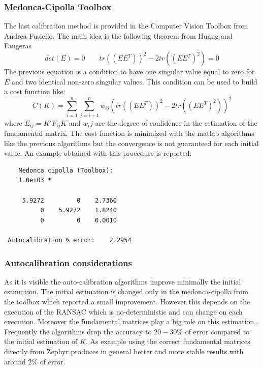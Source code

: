 \documentclass[12pt]{article}
\begin{document}
\subsubsection{Medonca-Cipolla Toolbox}
The last calibration method is provided in the Computer Vision Toolbox from Andrea Fusiello. The main idea is the following theorem from Huang and Faugeras \cite{Faugeras89}
\begin{equation}
    det(E) = 0 \qquad tr((EE^T))^2 - 2 tr((EE^T)^2) = 0
\end{equation}
The previous equation is a condition to have one singular value equal to zero for $E$ and two identical non-zero singular values. This condition can be used to build a cost function like:
\begin{equation}
    C(K) = \sum_{i=1}^{n} \sum_{j=i+1}^{n} w_{ij} (tr((EE^T))^2 - 2 tr((EE^T)^2))^2
\end{equation}
where $E_{ij} = K'F_{ij}K$ and $w_ij$ are the degree of confidence in the estimation of the fundamental matrix. The cost function is minimized with the matlab algorithms like the previous algorithms but the convergence is not guaranteed for each initial value. An example obtained with this procedure is reported:
\begin{verbatim}
    Medonca cipolla (Toolbox): 
    1.0e+03 *
 
     5.9272         0    2.7360
          0    5.9272    1.8240
          0         0    0.0010
 
 Autocalibration % error:	 2.2954  
\end{verbatim}
\newpage

\subsubsection{Autocalibration considerations}
As it is visible the auto-calibration algorithms improve minimally the initial estimation. The initial estimation is changed only in the medonca-cipolla from the toolbox which reported a small improvement. However this depends on the execution of the RANSAC which is no-deterministic and can change on each execution. Moreover the fundamental matrices play a big role on this estimation,. Frequently the algorithms drop the accuracy to $20-30\%$ of error compared to the initial estimation of $K$. As example using the correct fundamental matrices directly from Zephyr produces in general better and more stable results with around $2\%$ of error. 
\end{document}
